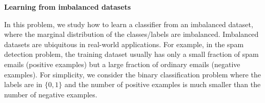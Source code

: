 \item {} {\bf Learning from imbalanced datasets}

In this problem, we study how to learn a classifier from an imbalanced dataset, where the marginal distribution of the classes/labels are imbalanced. Imbalanced datasets are ubiquitous in real-world applications. For example, in the spam detection problem, the training dataset usually has only a small fraction of spam emails (positive examples) but a large fraction of ordinary emails (negative examples). For simplicity, we consider the binary classification problem where the labels are in $\{0,1\}$ and the number of positive examples is much smaller than the number of negative examples. 


\begin{enumerate}
        
        \ifnum{} {
	  
        }\fi

		
		\ifnum{} {
			
		}\fi

		
		\ifnum{} {
		
		}\fi

        
        \ifnum{} {
        	
        }\fi
   

    
\end{enumerate}
